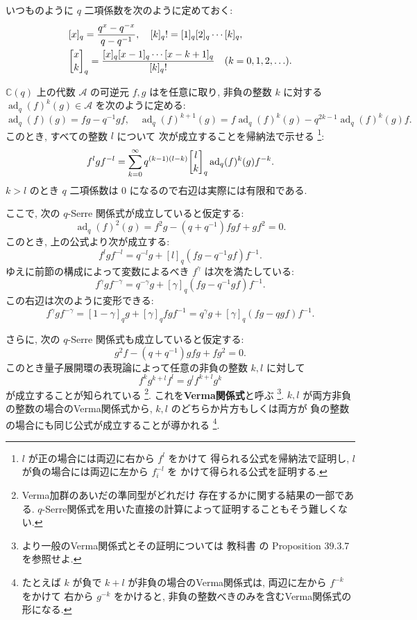 \documentclass[12pt,twoside,dvipdfm]{msjproc}
\newcommand\C{{\mathbb C}} %
\theoremstyle{definition} %
\theoremstyle{definition} %
\theoremstyle{definition} %
\numberwithin{theorem}{section}
\numberwithin{equation}{section}
\numberwithin{figure}{section}
\numberwithin{table}{section}
\newcommand\A{\mathcal{A}}
\newcommand\ad{\mathop{\mathrm{ad}}\nolimits}
\begin{document}
いつものように $q$ 二項係数を次のように定めておく:
\begin{align*}
 &
 [x]_q = \frac{q^x-q^{-x}}{q-q^{-1}}, \quad
 [k]_q! = [1]_q[2]_q\cdots[k]_q,
 \\ &
 \qbinom{x}{k}_q = \frac{[x]_q[x-1]_q\cdots[x-k+1]_q}{[k]_q!} \quad
 (k=0,1,2,\ldots).
\end{align*}

$\C(q)$ 上の代数 $\A$ の可逆元 $f,g$ はを任意に取り, 
非負の整数 $k$ に対する $\ad_q(f)^k(g)\in\A$ を次のように定める:
\begin{equation*}
  \ad_q(f)(g)= fg - q^{-1} gf, \quad
  \ad_q(f)^{k+1}(g) = f\ad_q(f)^k(g) - q^{2k-1}\ad_q(f)^k(g) f.
\end{equation*}
このとき, すべての整数 $l$ について
次が成立することを帰納法で示せる%
\footnote{$l$ が正の場合には両辺に右から $f^l$ をかけて
得られる公式を帰納法で証明し, $l$ が負の場合には両辺に左から $f_i^{-l}$ を
かけて得られる公式を証明する.}:
\begin{equation*}
  f^l g f^{-l} = 
  \sum_{k=0}^\infty q^{(k-1)(l-k)}\qbinom{l}{k}_q \ad_q(f)^k(g) f^{-k}.
\end{equation*}
$k>l$ のとき $q$ 二項係数は $0$ になるので右辺は実際には有限和である.

ここで, 次の $q$-Serre 関係式が成立していると仮定する:
\begin{equation*}
 \ad_q(f)^2(g) = f^2 g - (q+q^{-1})fgf + gf^2 = 0.
\end{equation*}
このとき, 上の公式より次が成立する:
\begin{equation*}
  f^l g f^{-l} = q^{-l}g + [l]_q(fg-q^{-1}gf)f^{-1}.
\end{equation*}
ゆえに前節の構成によって変数によるべき $f^\gamma$ は次を満たしている:
\begin{equation*}
 f^\gamma g f^{-\gamma} 
 = q^{-\gamma} g + [\gamma]_q(fg-q^{-1}gf)f^{-1}.
\end{equation*}
この右辺は次のように変形できる:
\begin{equation*}
 f^\gamma g f^{-\gamma}
 = [1-\gamma]_q g + [\gamma]_q fgf^{-1}
 = q^\gamma g + [\gamma]_q(fg-qgf)f^{-1}.
\end{equation*}

さらに, 次の $q$-Serre 関係式も成立していると仮定する:
\begin{equation*}
 g^2 f - (q+q^{-1})gfg + fg^2 = 0.
\end{equation*}
このとき量子展開環の表現論によって任意の非負の整数 $k,l$ に対して
\begin{equation*}
  f^k g^{k+l} f^l = g^l f^{k+l} g^k
\end{equation*}
が成立することが知られている%
\footnote{Verma加群のあいだの準同型がどれだけ
存在するかに関する結果の一部である.
$q$-Serre関係式を用いた直接の計算によって証明することもそう難しくない.}.
これを{\bf Verma関係式}と呼ぶ%
\footnote{より一般のVerma関係式とその証明については
教科書 \cite{Lusztig} の Proposition 39.3.7 を参照せよ.}.
$k,l$ が両方非負の整数の場合のVerma関係式から, 
$k,l$ のどちらか片方もしくは両方が
負の整数の場合にも同じ公式が成立することが導かれる%
\footnote{たとえば $k$ が負で $k+l$ が非負の場合のVerma関係式は, 
両辺に左から $f^{-k}$ をかけて 
右から $g^{-k}$ をかけると, 
非負の整数べきのみを含むVerma関係式の形になる.}.
\end{document}
